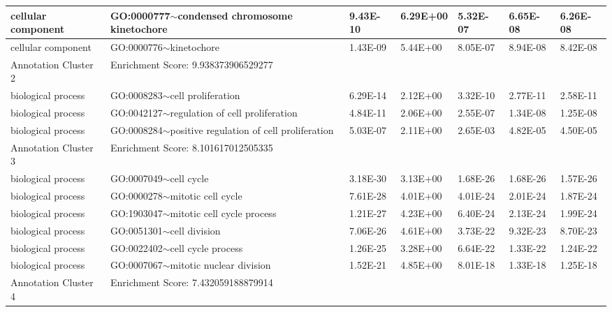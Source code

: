 \documentclass{article}
\begin{document}
\begin{landscape}
\begin{table}
{\begin{tabular}{|l|l|l|l|l|l|l|}
cellular component   & GO:0000777$\sim$condensed chromosome kinetochore          & 9.43E-10 & 6.29E+00        & 5.32E-07   & 6.65E-08  & 6.26E-08 \\ \hline
cellular component   & GO:0000776$\sim$kinetochore                               & 1.43E-09 & 5.44E+00        & 8.05E-07   & 8.94E-08  & 8.42E-08 \\ \hline\hline
Annotation Cluster 2 & Enrichment Score: 9.938373906529277                       &          &                 &            &           &          \\ \hline
biological process   & GO:0008283$\sim$cell proliferation                        & 6.29E-14 & 2.12E+00        & 3.32E-10   & 2.77E-11  & 2.58E-11 \\ \hline
biological process   & GO:0042127$\sim$regulation of cell proliferation          & 4.84E-11 & 2.06E+00        & 2.55E-07   & 1.34E-08  & 1.25E-08 \\ \hline
biological process   & GO:0008284$\sim$positive regulation of cell proliferation & 5.03E-07 & 2.11E+00        & 2.65E-03   & 4.82E-05  & 4.50E-05 \\ \hline\hline
Annotation Cluster 3 & Enrichment Score: 8.101617012505335                       &          &                 &            &           &          \\ \hline
biological process   & GO:0007049$\sim$cell cycle                                & 3.18E-30 & 3.13E+00        & 1.68E-26   & 1.68E-26  & 1.57E-26 \\ \hline
biological process   & GO:0000278$\sim$mitotic cell cycle                        & 7.61E-28 & 4.01E+00        & 4.01E-24   & 2.01E-24  & 1.87E-24 \\ \hline
biological process   & GO:1903047$\sim$mitotic cell cycle process                & 1.21E-27 & 4.23E+00        & 6.40E-24   & 2.13E-24  & 1.99E-24 \\ \hline
biological process   & GO:0051301$\sim$cell division                             & 7.06E-26 & 4.61E+00        & 3.73E-22   & 9.32E-23  & 8.70E-23 \\ \hline
biological process   & GO:0022402$\sim$cell cycle process                        & 1.26E-25 & 3.28E+00        & 6.64E-22   & 1.33E-22  & 1.24E-22 \\ \hline
biological process   & GO:0007067$\sim$mitotic nuclear division                  & 1.52E-21 & 4.85E+00        & 8.01E-18   & 1.33E-18  & 1.25E-18 \\ \hline\hline
Annotation Cluster 4 & Enrichment Score: 7.432059188879914                       &          &                 &            &           &          \\ \hline

\end{tabular}}
\end{table}
\end{landscape}
\end{document}
